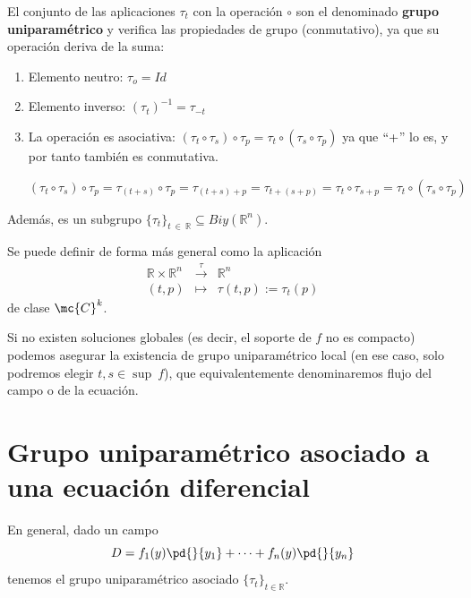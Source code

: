     \begin{defi}
        El conjunto de las aplicaciones $\tau_t$ con la operación $\circ$ son el denominado \textbf{grupo uniparamétrico} y verifica las propiedades de grupo (conmutativo), ya que su operación deriva de la suma: 
        \begin{enumerate}
            \item Elemento neutro: $\tau_o=Id$
            \item Elemento inverso: $(\tau_t)^{-1}=\tau_{-t}$
            \item La operación es asociativa: $(\tau_t \circ \tau_s) \circ \tau_p=\tau_t \circ (\tau_s \circ \tau_p)$ ya que $``+$'' lo es, y por tanto también es conmutativa.
            \begin{dem}
               $(\tau_t \circ \tau_s) \circ \tau_p =\tau_{(t+s)} \circ \tau_p =\tau_{(t+s)+p}=\tau_{t+(s+p)}=\tau_{t} \circ \tau_{s+p}= \tau_t \circ (\tau_s \circ \tau_p)$
            \end{dem}
        \end{enumerate}
        Además, es un subgrupo $\{\tau_t \}_{t \: \in \:  \mathbb R} \subseteq Biy (\mathbb R^n)$. 

        Se puede definir de forma más general como la aplicación
        $$\begin{array}{rcl}
         \mathbb R \times \mathbb R^n  & \overset{\tau}{\longrightarrow} & \mathbb R^n  \\
         (t,p) & \longmapsto & \tau(t,p):=\tau_t(p) 
    \end{array}$$
    de clase $\mc{C}^k$.
    \end{defi}
    \begin{obs}
        Si no existen soluciones globales (es decir, el soporte de $f$ no es compacto) podemos asegurar la existencia de grupo uniparamétrico local (en ese caso, solo podremos elegir $t,s \in \sup \: f$), que equivalentemente denominaremos flujo del campo o de la ecuación. 
    \end{obs}
    \section{Grupo uniparamétrico asociado a una ecuación diferencial}
    En general, dado un campo 
    $$D=f_1(y)\pd{}{y_1}+\cdots  + f_n(y) \pd{}{y_n}$$
    tenemos el grupo uniparamétrico asociado $\{\tau_t\}_{t \in \mathbb R}$.

